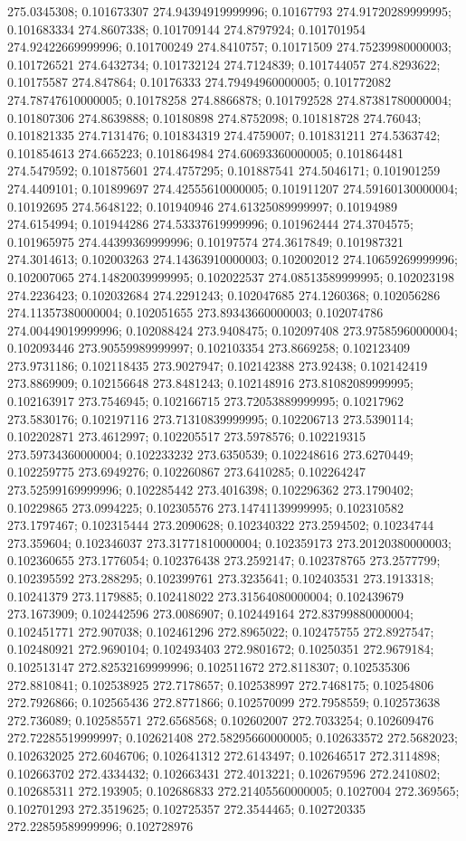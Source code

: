 275.0345308; 0.101673307 274.94394919999996; 0.10167793 274.91720289999995; 0.101683334 274.8607338; 0.101709144 274.8797924; 0.101701954 274.92422669999996; 0.101700249 274.8410757; 0.10171509 274.75239980000003; 0.101726521 274.6432734; 0.101732124 274.7124839; 0.101744057 274.8293622; 0.10175587 274.847864; 0.10176333 274.79494960000005; 0.101772082 274.78747610000005; 0.10178258 274.8866878; 0.101792528 274.87381780000004; 0.101807306 274.8639888; 0.10180898 274.8752098; 0.101818728 274.76043; 0.101821335 274.7131476; 0.101834319 274.4759007; 0.101831211 274.5363742; 0.101854613 274.665223; 0.101864984 274.60693360000005; 0.101864481 274.5479592; 0.101875601 274.4757295; 0.101887541 274.5046171; 0.101901259 274.4409101; 0.101899697 274.42555610000005; 0.101911207 274.59160130000004; 0.10192695 274.5648122; 0.101940946 274.61325089999997; 0.10194989 274.6154994; 0.101944286 274.53337619999996; 0.101962444 274.3704575; 0.101965975 274.44399369999996; 0.10197574 274.3617849; 0.101987321 274.3014613; 0.102003263 274.14363910000003; 0.102002012 274.10659269999996; 0.102007065 274.14820039999995; 0.102022537 274.08513589999995; 0.102023198 274.2236423; 0.102032684 274.2291243; 0.102047685 274.1260368; 0.102056286 274.11357380000004; 0.102051655 273.89343660000003; 0.102074786 274.00449019999996; 0.102088424 273.9408475; 0.102097408 273.97585960000004; 0.102093446 273.90559989999997; 0.102103354 273.8669258; 0.102123409 273.9731186; 0.102118435 273.9027947; 0.102142388 273.92438; 0.102142419 273.8869909; 0.102156648 273.8481243; 0.102148916 273.81082089999995; 0.102163917 273.7546945; 0.102166715 273.72053889999995; 0.10217962 273.5830176; 0.102197116 273.71310839999995; 0.102206713 273.5390114; 0.102202871 273.4612997; 0.102205517 273.5978576; 0.102219315 273.59734360000004; 0.102233232 273.6350539; 0.102248616 273.6270449; 0.102259775 273.6949276; 0.102260867 273.6410285; 0.102264247 273.52599169999996; 0.102285442 273.4016398; 0.102296362 273.1790402; 0.10229865 273.0994225; 0.102305576 273.14741139999995; 0.102310582 273.1797467; 0.102315444 273.2090628; 0.102340322 273.2594502; 0.10234744 273.359604; 0.102346037 273.31771810000004; 0.102359173 273.20120380000003; 0.102360655 273.1776054; 0.102376438 273.2592147; 0.102378765 273.2577799; 0.102395592 273.288295; 0.102399761 273.3235641; 0.102403531 273.1913318; 0.10241379 273.1179885; 0.102418022 273.31564080000004; 0.102439679 273.1673909; 0.102442596 273.0086907; 0.102449164 272.83799880000004; 0.102451771 272.907038; 0.102461296 272.8965022; 0.102475755 272.8927547; 0.102480921 272.9690104; 0.102493403 272.9801672; 0.10250351 272.9679184; 0.102513147 272.82532169999996; 0.102511672 272.8118307; 0.102535306 272.8810841; 0.102538925 272.7178657; 0.102538997 272.7468175; 0.10254806 272.7926866; 0.102565436 272.8771866; 0.102570099 272.7958559; 0.102573638 272.736089; 0.102585571 272.6568568; 0.102602007 272.7033254; 0.102609476 272.72285519999997; 0.102621408 272.58295660000005; 0.102633572 272.5682023; 0.102632025 272.6046706; 0.102641312 272.6143497; 0.102646517 272.3114898; 0.102663702 272.4334432; 0.102663431 272.4013221; 0.102679596 272.2410802; 0.102685311 272.193905; 0.102686833 272.21405560000005; 0.1027004 272.369565; 0.102701293 272.3519625; 0.102725357 272.3544465; 0.102720335 272.22859589999996; 0.102728976 